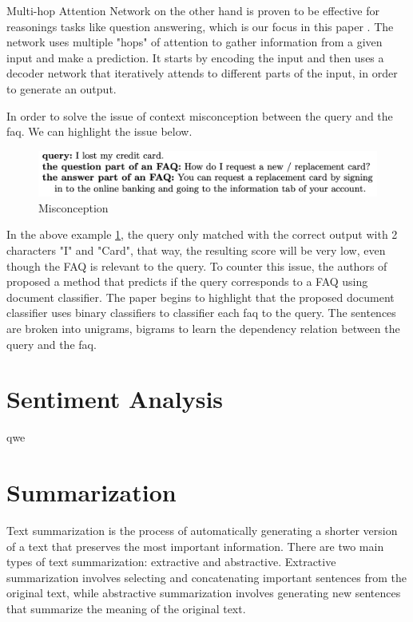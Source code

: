 Multi-hop Attention Network on the other hand is proven to be effective for reasonings tasks like question answering, which is our focus in this paper \cite{faq_gen_1}. The network uses multiple "hops" of attention to gather information from a given input and make a prediction. It starts by encoding the input and then uses a decoder network that iteratively attends to different parts of the input, in order to generate an output.

In order to solve the issue of context misconception between the query and the faq. We can highlight the issue below. 

\begin{figure}[H]
  \centering
  \noindent \includegraphics[scale=0.85]{assets/An_FAQ_search_method_query_issue.png}
\caption{Misconception}\label{misconception_1}
\end{figure}

In the above example \ref*{misconception_1}, the query only matched with the correct output with 2 characters "I" and "Card", that way, the resulting score will be very low, even though the FAQ is relevant to the query. To counter this issue, the authors of \cite{10.1007/978-3-319-42911-3_25} proposed a method that predicts if the query corresponds to a FAQ using document classifier. The paper begins to highlight that the proposed document classifier uses binary classifiers to classifier each faq to the query. The sentences are broken into unigrams, bigrams to learn the dependency relation between the query and the faq.

\pagebreak

\section{Sentiment Analysis}
qwe

\pagebreak
\section{Summarization}
Text summarization is the process of automatically generating a shorter version of a text that preserves the most important information. There are two main types of text summarization: extractive and abstractive. Extractive summarization involves selecting and concatenating important sentences from the original text, while abstractive summarization involves generating new sentences that summarize the meaning of the original text.

